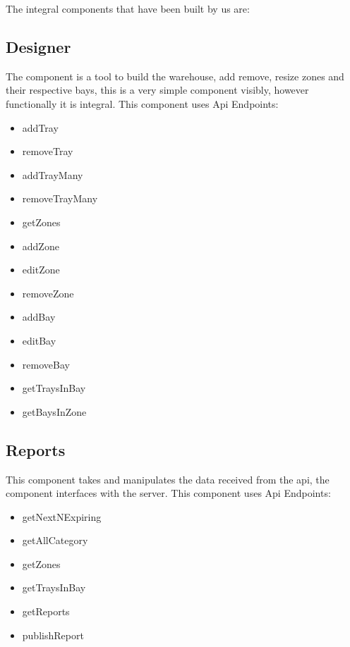 \documentclass[letterpaper,10pt,english]{sphinxmanual}
\begin{document}
The integral components that have been built by us are:


\subsection{Designer}
\label{\detokenize{docs/System_Overview/Frontend_overview:designer}}
The component is a tool to build the warehouse, add remove, resize zones
and their respective bays, this is a very simple component visibly,
however functionally it is integral. This component uses Api Endpoints:
\begin{itemize}
\item {} 
addTray

\item {} 
removeTray

\item {} 
addTrayMany

\item {} 
removeTrayMany

\item {} 
getZones

\item {} 
addZone

\item {} 
editZone

\item {} 
removeZone

\item {} 
addBay

\item {} 
editBay

\item {} 
removeBay

\item {} 
getTraysInBay

\item {} 
getBaysInZone

\end{itemize}


\subsection{Reports}
\label{\detokenize{docs/System_Overview/Frontend_overview:reports}}
This component takes and manipulates the data received from the api, the
component interfaces with the server. This component uses Api Endpoints:
\begin{itemize}
\item {} 
getNextNExpiring

\item {} 
getAllCategory

\item {} 
getZones

\item {} 
getTraysInBay

\item {} 
getReports

\item {} 
publishReport

\end{itemize}
\end{document}

